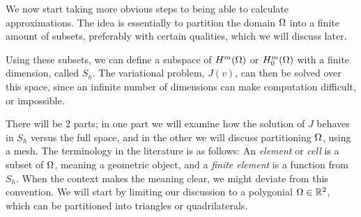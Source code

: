 We now start taking more obvious steps to being able to calculate approximations. 
The idea is essentially to partition the domain $\Omega$ into a finite amount 
of subsets, preferably with certain qualities, which we will discuss later. 

Using these subsets, we can define a subspace of $H^m(\Omega)$ or $H^m_0(\Omega)$ 
with a finite dimension, called $S_h$. The variational problem, $J(v)$, can then be 
solved over this space, since an infinite number of dimensions can make 
computation difficult, or impossible.

There will be $2$ parts; in one part we 
will examine how the solution of $J$ behaves in $S_h$ versus the full space, 
and in the other we will discuss partitioning $\Omega$, using a mesh.
The terminology in the literature is as follows: An \emph{element} or \emph{cell} is a 
subset of $\Omega$, meaning a geometric object, and a \emph{finite element} is a 
function from $S_h$. When the context makes the meaning clear, we might deviate from 
this convention.
We will start by limiting our discussion to a polygonial $\Omega \in \mathbb{R}^2$, which 
can be partitioned into triangles or quadrilaterals.